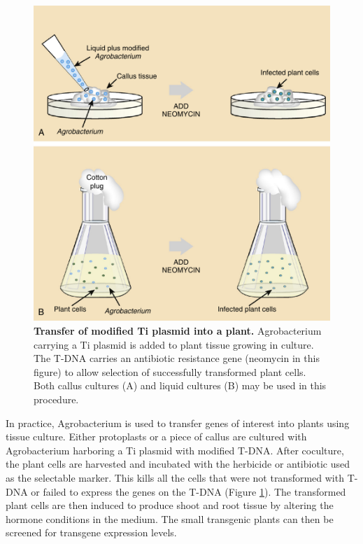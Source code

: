 \documentclass[nofonts,]{tufte-handout}
\begin{document}
\begin{figure}
\includegraphics[width=0.95\linewidth]{./images/agrobacterium_infection_culture} \caption{\textbf{Transfer of modified Ti plasmid into a plant.} Agrobacterium carrying a Ti plasmid is added to plant tissue growing in culture. The T-DNA carries an antibiotic resistance gene (neomycin in this figure) to allow selection of successfully transformed plant cells. Both callus cultures (A) and liquid cultures (B) may be used in this procedure.}\label{fig:agrobacterium-infection-culture}
\end{figure}

In practice, Agrobacterium is used to transfer genes of interest into
plants using tissue culture. Either protoplasts or a piece of callus are
cultured with Agrobacterium harboring a Ti plasmid with modified T-DNA.
After coculture, the plant cells are harvested and incubated with the
herbicide or antibiotic used as the selectable marker. This kills all
the cells that were not transformed with T-DNA or failed to express the
genes on the T-DNA (Figure \ref{fig:agrobacterium-infection-culture}).
The transformed plant cells are then induced to produce shoot and root
tissue by altering the hormone conditions in the medium. The small
transgenic plants can then be screened for transgene expression levels.
\end{document}
